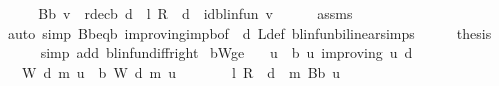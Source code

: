 \begin{isabellebody}
\ \ \isamarkupfalse%
\ \isamarkupfalse%
\ {\isachardoublequoteopen}B\isactrlsub b\ v\ {\isacharequal}{\kern0pt}\ r{\isacharunderscore}{\kern0pt}dec\isactrlsub b\ d\ {\isacharplus}{\kern0pt}\ {\isacharparenleft}{\kern0pt}l\ {\isacharasterisk}{\kern0pt}\isactrlsub R\ {\isasymP}\ d\ {\isacharminus}{\kern0pt}\ id{\isacharunderscore}{\kern0pt}blinfun{\isacharparenright}{\kern0pt}\ v{\isachardoublequoteclose}\isanewline
\ \ \ \ \isamarkupfalse%
\ assms\isanewline
\ \ \ \ \isamarkupfalse%
\ {\isacharparenleft}{\kern0pt}auto\ simp{\isacharcolon}{\kern0pt}\ B\isactrlsub b{\isacharunderscore}{\kern0pt}eq{\isacharunderscore}{\kern0pt}{\isasymL}\isactrlsub b\ {\isasymnu}{\isacharunderscore}{\kern0pt}improving{\isacharunderscore}{\kern0pt}imp{\isacharunderscore}{\kern0pt}{\isasymL}\isactrlsub b{\isacharbrackleft}{\kern0pt}of\ {\isacharunderscore}{\kern0pt}\ d{\isacharbrackright}{\kern0pt}\ L{\isacharunderscore}{\kern0pt}def\ blinfun{\isachardot}{\kern0pt}bilinear{\isacharunderscore}{\kern0pt}simps{\isacharparenright}{\kern0pt}\isanewline
\ \ \isamarkupfalse%
\ \isamarkupfalse%
\ {\isacharquery}{\kern0pt}thesis\isanewline
\ \ \ \ \isamarkupfalse%
\ {\isacharparenleft}{\kern0pt}simp\ add{\isacharcolon}{\kern0pt}\ blinfun{\isachardot}{\kern0pt}diff{\isacharunderscore}{\kern0pt}right{\isacharparenright}{\kern0pt}\isanewline
{}\isamarkupfalse%
%
\endisatagproof
{\isafoldproof}%
%
\isadelimproof
\isanewline
%
\endisadelimproof
\isanewline
{}\isamarkupfalse%
\ {\isasymL}\isactrlsub b{\isacharunderscore}{\kern0pt}W{\isacharunderscore}{\kern0pt}ge{\isacharcolon}{\kern0pt}\isanewline
\ \ \ {\isachardoublequoteopen}u\ {\isasymle}\ {\isasymL}\isactrlsub b\ u{\isachardoublequoteclose}\ {\isachardoublequoteopen}{\isasymnu}{\isacharunderscore}{\kern0pt}improving\ u\ d{\isachardoublequoteclose}\isanewline
\ \ \ {\isachardoublequoteopen}W\ d\ m\ u\ {\isasymle}\ {\isasymL}\isactrlsub b\ {\isacharparenleft}{\kern0pt}W\ d\ m\ u{\isacharparenright}{\kern0pt}{\isachardoublequoteclose}\isanewline
%
\isadelimproof
%
\endisadelimproof
%
\isatagproof
{}\isamarkupfalse%
\ {\isacharminus}{\kern0pt}\isanewline
\ \ \isamarkupfalse%
\ {\isachardoublequoteopen}{}\ {\isasymle}\ {\isacharparenleft}{\kern0pt}{\isacharparenleft}{\kern0pt}l\ {\isacharasterisk}{\kern0pt}\isactrlsub R\ {\isasymP}\ d{\isacharparenright}{\kern0pt}\ {\isacharcircum}{\kern0pt}{\isacharcircum}{\kern0pt}\ m{\isacharparenright}{\kern0pt}\ {\isacharparenleft}{\kern0pt}B\isactrlsub b\ u{\isacharparenright}{\kern0pt}{\isachardoublequoteclose}\isanewline

\end{isabellebody}
